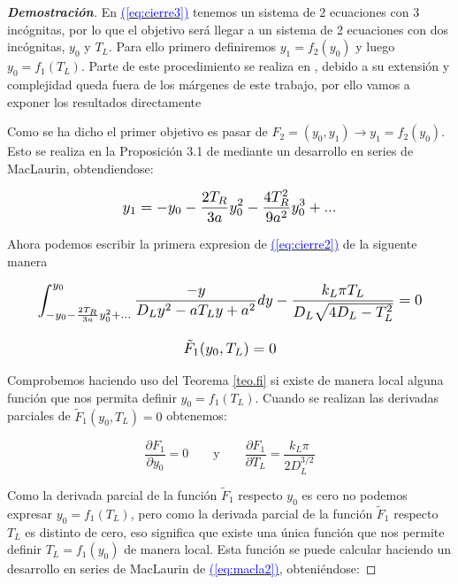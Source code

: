\documentclass[12pt,a4paper]{report} %
\newcommand{\eref}[1]{\hyperref[#1]{\textcolor{blue}{(\ref*{#1})}}}
\newcommand{\eref}[1]{\hyperref[#1]{\textcolor{blue}{\textit{(\ref*{#1})}}}}
\begin{document}
\begin{proof}[\textbf{Demostración}]
	\newpage
	
	\vspace{0.5cm}\noindent En \eref{eq:cierre3} tenemos un sistema de 2 ecuaciones con 3 incógnitas, por lo que el objetivo será llegar a un sistema de 2 ecuaciones con dos incógnitas, $y_0$ y $T_L$. Para ello primero definiremos $y_1=f_2(y_0)$ y luego $y_0=f_1(T_L)$. Parte de este procedimiento se realiza en \cite{properties}, debido a su extensión y complejidad queda fuera de los márgenes de este trabajo, por ello vamos a exponer los resultados directamente 
	
	\vspace{0.5cm}Como se ha dicho el primer objetivo es pasar de $F_2=(y_0,y_1) \longrightarrow y_1=f_2(y_0)$. Esto se realiza en la Proposición 3.1 de \cite{properties} mediante un desarrollo en series de MacLaurin, obtendiendose:
	
		\begin{equation}
		\label{eq:macla}
		\scalebox{1.2}{$\displaystyle
			y_1=-y_0-\frac{2T_R}{3a}y_0^2-\frac{4T_R^2}{9a^2}y_0^3+...
			$}
	\end{equation}\smallskip
	
	\vspace{0.5cm}\noindent Ahora podemos escribir la primera expresion de \eref{eq:cierre2} de la siguente manera
	
	\begin{equation}
		\label{eq:macla2}
		\scalebox{1.2}{$\displaystyle
			\begin{gathered}
				\int_{-y_0-\frac{2T_R}{3a}y_0^2+...}^{y_0}\frac{-y}{D_Ly^2-aT_Ly+a^2}dy-\frac{k_L\pi T_L}{D_L\sqrt{4D_L-T_L^2}}=0\\[3mm]
				\tilde{F}_1(y_0,T_L)=0
			\end{gathered}	
			$}
	\end{equation}

	\vspace{0.5cm} Comprobemos haciendo uso del Teorema \ref{teo.fi} si existe de manera local alguna función que nos permita definir $y_0=f_1(T_L)$. Cuando se realizan las derivadas parciales de $\tilde{F}_1(y_0,T_L)=0$ obtenemos:
	
	\begin{equation}
		\label{dpar}
		\frac{\partial F_1}{\partial y_0}=0 \qquad \text{y} \qquad \frac{\partial F_1}{\partial T_L}=\frac{k_L\pi}{2D_L^{3/2}}
	\end{equation}\smallskip
	
	\vspace{0.5cm}\noindent Como la derivada parcial de la función $\tilde{F}_1$ respecto $y_0$ es cero no podemos expresar $y_0=f_1(T_L)$, pero como la derivada parcial de la función $\tilde{F}_1$ respecto $T_L$ es distinto de cero, eso significa que existe una única función que nos permite definir $T_L=f_1(y_0)$ de manera local. Esta función se puede calcular haciendo un desarrollo en series de MacLaurin de \eref{eq:macla2}, obteniéndose:
	

\end{proof}
\end{document}
